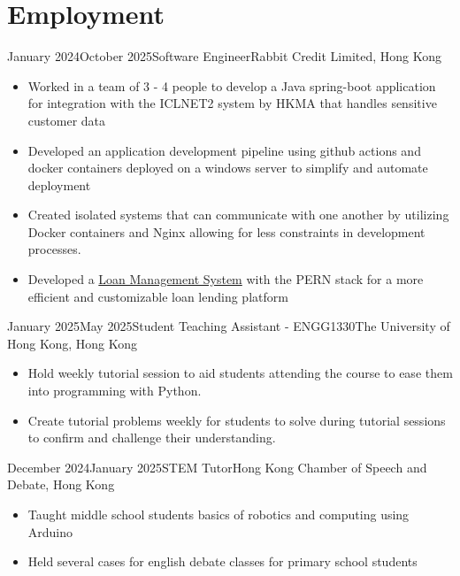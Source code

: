 \documentclass{cv}
\begin{document}
%
%
%
	
	\section*{Employment}
	\begin{employment}{January 2024}{October 2025}{Software Engineer}{Rabbit Credit Limited, Hong Kong}
	    \begin{itemize}
    	    \item Worked in a team of 3 - 4 people to develop a Java spring-boot application for integration with the ICLNET2 system by HKMA that handles sensitive customer data
            \item Developed an application development pipeline using github actions and docker containers deployed on a windows server to simplify and automate deployment
            \item Created isolated systems that can communicate with one another by utilizing Docker containers and Nginx allowing for less constraints in development processes.
            \item Developed a \href{https://github.com/Nepranal/notes/blob/main/Considerations%20In%20Building%20A%20Backend%20For%20Management%20Systems.md}{Loan Management System} with the PERN stack for a more efficient and customizable loan lending platform
        \end{itemize}
	\end{employment}

    \begin{employment}{January 2025}{May 2025}{Student Teaching Assistant - ENGG1330}{The University of Hong Kong, Hong Kong}
	    \begin{itemize}
    	    \item Hold weekly tutorial session to aid students attending the course to ease them into programming with Python.
            \item Create tutorial problems weekly for students to solve during tutorial sessions to confirm and challenge their understanding.
        \end{itemize}
	\end{employment}

    \begin{employment}{December 2024}{January 2025}{STEM Tutor}{Hong Kong Chamber of Speech and Debate, Hong Kong}
	    \begin{itemize}
    	    \item Taught middle school students basics of robotics and computing using Arduino
            \item Held several cases for english debate classes for primary school students
        \end{itemize}
	\end{employment}
\end{document}
